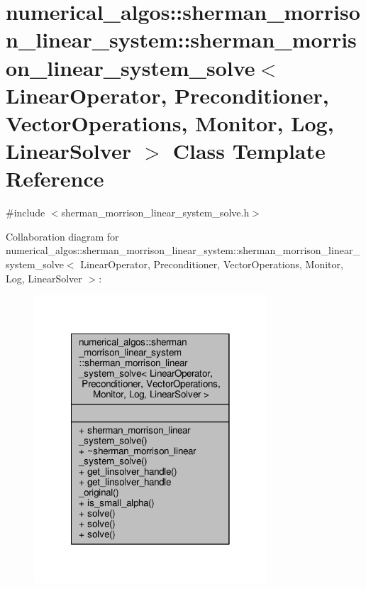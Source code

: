 \hypertarget{classnumerical__algos_1_1sherman__morrison__linear__system_1_1sherman__morrison__linear__system__solve}{\section{numerical\-\_\-algos\-:\-:sherman\-\_\-morrison\-\_\-linear\-\_\-system\-:\-:sherman\-\_\-morrison\-\_\-linear\-\_\-system\-\_\-solve$<$ Linear\-Operator, Preconditioner, Vector\-Operations, Monitor, Log, Linear\-Solver $>$ Class Template Reference}
\label{classnumerical__algos_1_1sherman__morrison__linear__system_1_1sherman__morrison__linear__system__solve}
}


{\ttfamily \#include $<$sherman\-\_\-morrison\-\_\-linear\-\_\-system\-\_\-solve.\-h$>$}



Collaboration diagram for numerical\-\_\-algos\-:\-:sherman\-\_\-morrison\-\_\-linear\-\_\-system\-:\-:sherman\-\_\-morrison\-\_\-linear\-\_\-system\-\_\-solve$<$ Linear\-Operator, Preconditioner, Vector\-Operations, Monitor, Log, Linear\-Solver $>$\-:\nopagebreak
\begin{figure}[H]
\begin{center}
\leavevmode
\includegraphics[width=246pt]{classnumerical__algos_1_1sherman__morrison__linear__system_1_1sherman__morrison__linear__system__solve__coll__graph}
\end{center}
\end{figure}
